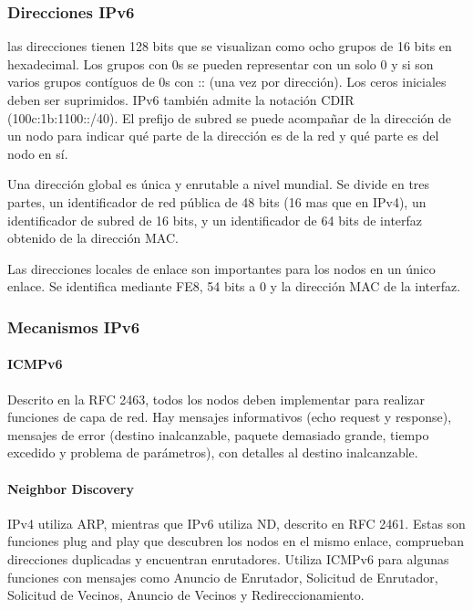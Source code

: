     \subsubsection{Direcciones IPv6} %
        las direcciones tienen 128 bits que se visualizan como ocho grupos de 16 bits en hexadecimal. Los grupos con 0s se pueden representar con un solo 0 y si son varios grupos contíguos de 0s con :: (una vez por dirección). Los ceros iniciales deben ser suprimidos. IPv6 también admite la notación CDIR (100c:1b:1100::/40). El prefijo de subred se puede acompañar de la dirección de un nodo para indicar qué parte de la dirección es de la red y qué parte es del nodo en sí.

        Una dirección global es única y enrutable a nivel mundial. Se divide en tres partes, un identificador de red pública de 48 bits (16 mas que en IPv4), un identificador de subred de 16 bits, y un identificador de 64 bits de interfaz obtenido de la dirección MAC.

        Las direcciones locales de enlace son importantes para los nodos en un único enlace. Se identifica mediante FE8, 54 bits a 0 y la dirección MAC de la interfaz.

    \subsubsection{Mecanismos IPv6} %
        \paragraph{ICMPv6}
            Descrito en la RFC 2463, todos los nodos deben implementar para realizar funciones de capa de red. Hay mensajes informativos (echo request y response), mensajes de error (destino inalcanzable, paquete demasiado grande, tiempo excedido y problema de parámetros), con detalles al destino inalcanzable.

        \paragraph{Neighbor Discovery}
            IPv4 utiliza ARP, mientras que IPv6 utiliza ND, descrito en RFC 2461. Estas son funciones plug and play que descubren los nodos en el mismo enlace, comprueban direcciones duplicadas y encuentran enrutadores. Utiliza ICMPv6 para algunas funciones con mensajes como Anuncio de Enrutador, Solicitud de Enrutador, Solicitud de Vecinos, Anuncio de Vecinos y Redireccionamiento.

